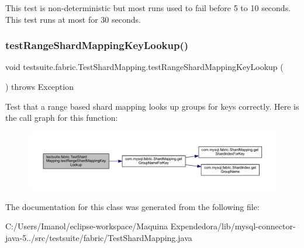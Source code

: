 This test is non-\/deterministic but most runs used to fail before 5 to 10 seconds. This test runs at most for 30 seconds. \mbox{\label{classtestsuite_1_1fabric_1_1_test_shard_mapping_a6b77d1255324c5140498ebae4aed5030}} 
\subsubsection{\texorpdfstring{test\+Range\+Shard\+Mapping\+Key\+Lookup()}{testRangeShardMappingKeyLookup()}}
{\footnotesize\ttfamily void testsuite.\+fabric.\+Test\+Shard\+Mapping.\+test\+Range\+Shard\+Mapping\+Key\+Lookup (\begin{DoxyParamCaption}{ }\end{DoxyParamCaption}) throws Exception}

Test that a range based shard mapping looks up groups for keys correctly. Here is the call graph for this function\+:
\nopagebreak
\begin{figure}[H]
\begin{center}
\leavevmode
\includegraphics[width=350pt]{classtestsuite_1_1fabric_1_1_test_shard_mapping_a6b77d1255324c5140498ebae4aed5030_cgraph}
\end{center}
\end{figure}


The documentation for this class was generated from the following file\+:\begin{DoxyCompactItemize}
\item 
C\+:/\+Users/\+Imanol/eclipse-\/workspace/\+Maquina Expendedora/lib/mysql-\/connector-\/java-\/5../src/testsuite/fabric/Test\+Shard\+Mapping.\+java\end{DoxyCompactItemize}
